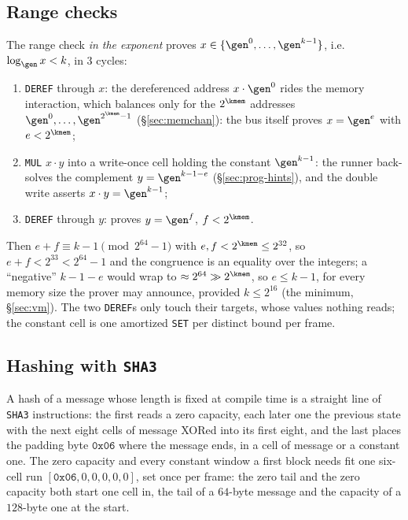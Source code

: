 \subsection{Range checks}\label{sec:prog-range-checks}

The range check \emph{in the exponent} proves $x\in\{\gen^{0},\dots,\gen^{k-1}\}$, i.e.\ $\log_{\gen}x<k$, in 3 cycles:
\begin{enumerate}
\item \texttt{DEREF} through $x$: the dereferenced address $x\cdot\gen^{0}$ rides the memory interaction, which balances only for the $2^{\kmem}$ addresses $\gen^{0},\dots,\gen^{2^{\kmem}-1}$ (\S\ref{sec:memchan}): the bus itself proves $x=\gen^{e}$ with $e<2^{\kmem}$;
\item \texttt{MUL} $x\cdot y$ into a write-once cell holding the constant $\gen^{k-1}$: the runner back-solves the complement $y=\gen^{k-1-e}$ (\S\ref{sec:prog-hints}), and the double write asserts $x\cdot y=\gen^{k-1}$;
\item \texttt{DEREF} through $y$: proves $y=\gen^{f}$, $f<2^{\kmem}$.
\end{enumerate}
Then $e+f\equiv k-1\pmod{2^{64}-1}$ with $e,f<2^{\kmem}\le2^{32}$, so $e+f<2^{33}<2^{64}-1$ and the congruence is an equality over the integers; a ``negative'' $k-1-e$ would wrap to $\approx2^{64}\gg2^{\kmem}$, so $e\le k-1$, for every memory size the prover may announce, provided $k\le2^{16}$ (the minimum, \S\ref{sec:vm}). The two \texttt{DEREF}s only touch their targets, whose values nothing reads; the constant cell is one amortized \texttt{SET} per distinct bound per frame.

\subsection{Hashing with \texttt{SHA3}}\label{sec:prog-hashing}

A hash of a message whose length is fixed at compile time is a straight line of \texttt{SHA3} instructions: the first reads a zero capacity, each later one the previous state with the next eight cells of message XORed into its first eight, and the last places the padding byte $\mathtt{0x06}$ where the message ends, in a cell of message or a constant one. The zero capacity and every constant window a first block needs fit one six-cell run $[\mathtt{0x06},0,0,0,0,0]$, set once per frame: the zero tail and the zero capacity both start one cell in, the tail of a $64$-byte message and the capacity of a $128$-byte one at the start.

